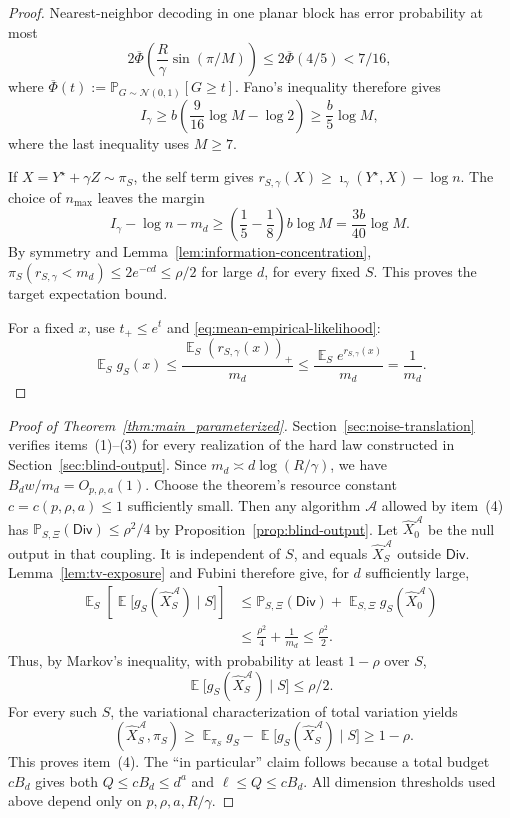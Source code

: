 \documentclass[11pt,letterpaper]{article}
\DeclareMathOperator*{\E}{\mathbb{E}}
\newcommand{\1}{\mathbbm{1}}
\DeclareMathOperator{\TV}{d_{\mathrm{TV}}}
\newcommand{\Prob}{\mathbb P}
\newcommand{\cN}{\mathcal N}
\begin{document}
\begin{proof}
Nearest-neighbor decoding in one planar block has error probability at most
\[
   2\overline\Phi\left(
      \frac R\gamma\sin(\pi/M)
   \right)
   \le2\overline\Phi(4/5)<7/16,
\]
where \(\overline\Phi(t):=\Prob_{G\sim\cN(0,1)}[G\ge t]\).
Fano's inequality \cite[Theorem~2.10.1 and the following
corollary]{coverthomas2006} therefore gives
\[
   I_\gamma
   \ge b\left(\frac9{16}\log M-\log2\right)
   \ge\frac b5\log M,
\]
where the last inequality uses \(M\ge7\).

If \(X=Y^\star+\gamma Z\sim\pi_S\), the self term gives
\(r_{S,\gamma}(X)\ge\imath_\gamma(Y^\star,X)-\log n\).
The choice of \(n_{\max}\) leaves the margin
\[
   I_\gamma-\log n-m_d
   \ge\left(\frac15-\frac18\right)b\log M
   =\frac{3b}{40}\log M.
\]
By symmetry and Lemma~\ref{lem:information-concentration},
\(\pi_S(r_{S,\gamma}<m_d)\le2e^{-cd}\le\rho/2\) for large \(d\),
for every fixed \(S\).  This proves the target expectation bound.

For a fixed \(x\), use \(t_+\le e^t\) and
\eqref{eq:mean-empirical-likelihood}:
\[
   \E_S g_S(x)
   \le\frac{\E_S(r_{S,\gamma}(x))_+}{m_d}
   \le\frac{\E_S e^{r_{S,\gamma}(x)}}{m_d}
   =\frac1{m_d}.
\]
\end{proof}

\begin{proof}[Proof of Theorem~\ref{thm:main_parameterized}]
Section~\ref{sec:noise-translation} verifies
items~\textup{(1)}--\textup{(3)} for every realization of the hard law
constructed in Section~\ref{sec:blind-output}.
Since \(m_d\asymp d\log(R/\gamma)\), we have
\(B_dw/m_d=O_{p,\rho,a}(1)\).  Choose the theorem's resource constant
\(c=c(p,\rho,a)\le1\) sufficiently small.  Then any algorithm
\(\mathcal A\) allowed by item~\textup{(4)} has
\(\Prob_{S,\Xi}(\mathsf{Div})\le\rho^2/4\) by
Proposition~\ref{prop:blind-output}.
Let \(\widehat X_0^{\mathcal A}\) be the null output in that coupling.
It is independent of \(S\), and equals \(\widehat X_S^{\mathcal A}\)
outside \(\mathsf{Div}\).
Lemma~\ref{lem:tv-exposure} and Fubini therefore give, for \(d\)
sufficiently large,
\[
\begin{aligned}
   \E_S\!\left[
      \E\bigl[g_S(\widehat X_S^{\mathcal A})\mid S\bigr]
   \right]
   &\le
   \Prob_{S,\Xi}(\mathsf{Div})
   +\E_{S,\Xi}g_S(\widehat X_0^{\mathcal A})\\
   &\le\frac{\rho^2}{4}+\frac1{m_d}
    \le\frac{\rho^2}{2}.
\end{aligned}
\]
Thus, by Markov's inequality, with probability at least \(1-\rho\)
over \(S\),
\[
   \E\bigl[g_S(\widehat X_S^{\mathcal A})\mid S\bigr]
   \le\rho/2.
\]
For every such \(S\), the variational characterization of total
variation yields
\[
   \TV(\widehat X_S^{\mathcal A},\pi_S)
   \ge\E_{\pi_S}g_S
      -\E\bigl[g_S(\widehat X_S^{\mathcal A})\mid S\bigr]
   \ge1-\rho.
\]
This proves item~\textup{(4)}.  The ``in particular''
claim follows because a total budget \(cB_d\) gives both
\(Q\le cB_d\le d^a\) and \(\ell\le Q\le cB_d\).
All dimension thresholds used above depend only on \(p,\rho,a,R/\gamma\).
\end{proof}
\end{document}
